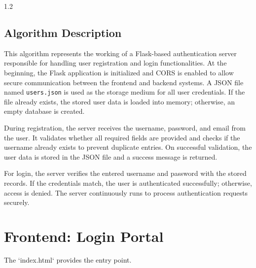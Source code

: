 \documentclass[12pt, a4paper]{report}
\begin{document}
\begin{spacing}{1.2}
\subsection*{Algorithm Description}

This algorithm represents the working of a Flask-based authentication server responsible for handling user registration and login functionalities. At the beginning, the Flask application is initialized and CORS is enabled to allow secure communication between the frontend and backend systems. A JSON file named \texttt{users.json} is used as the storage medium for all user credentials. If the file already exists, the stored user data is loaded into memory; otherwise, an empty database is created.

During registration, the server receives the username, password, and email from the user. It validates whether all required fields are provided and checks if the username already exists to prevent duplicate entries. On successful validation, the user data is stored in the JSON file and a success message is returned.

For login, the server verifies the entered username and password with the stored records. If the credentials match, the user is authenticated successfully; otherwise, access is denied. The server continuously runs to process authentication requests securely.\\

\vspace{-1cm}
\section{Frontend: Login Portal}
The `index.html` provides the entry point.


\end{spacing}
\end{document}

